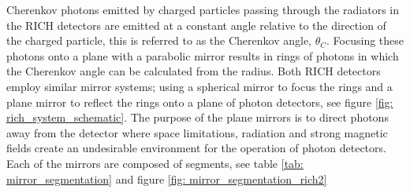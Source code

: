 Cherenkov photons emitted by charged particles passing through the radiators in the RICH detectors are emitted at a constant angle relative to the direction of the charged particle, this is referred to as the Cherenkov angle, $\theta_C$. Focusing these photons onto a plane with a parabolic mirror results in rings of photons in which the Cherenkov angle can be calculated from the radius. Both RICH detectors employ similar mirror systems; using a spherical mirror to focus the rings and a plane mirror to reflect the rings onto a plane of photon detectors, see figure \ref{fig: rich_system_schematic}. The purpose of the plane mirrors is to direct photons away from the detector where space limitations, radiation and strong magnetic fields create an undesirable environment for the operation of photon detectors. Each of the mirrors are composed of segments, see table \ref{tab: mirror_segmentation} and figure \ref{fig: mirror_segmentation_rich2}

